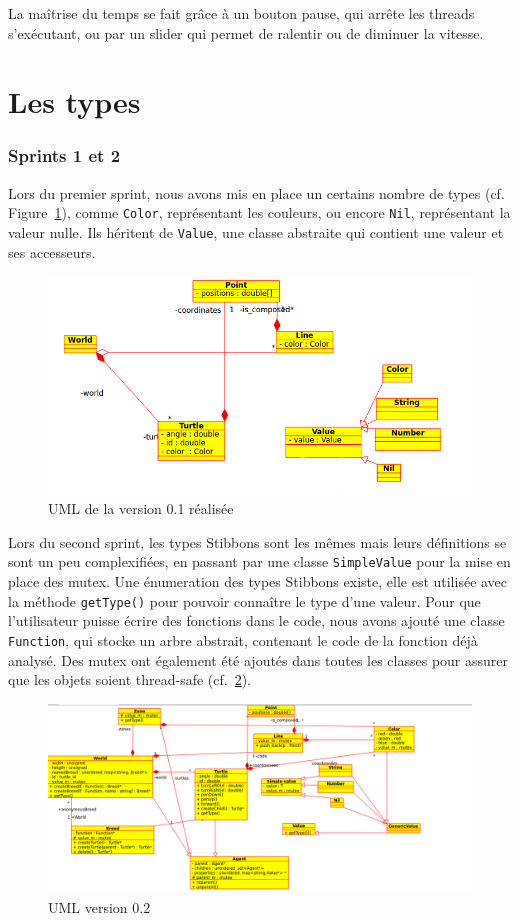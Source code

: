 La maîtrise du temps se fait grâce à un bouton pause, qui arrête les threads s'exécutant, ou par un slider qui permet de ralentir ou de diminuer la vitesse.

\section{Les types}
\subsubsection{Sprints 1 et 2}
Lors du premier sprint, nous avons mis en place un certains nombre de types (cf. Figure~\ref{v0.1R}), comme \verb|Color|, représentant les couleurs, ou encore \verb|Nil|, représentant la valeur nulle. Ils héritent de \verb|Value|, une classe abstraite qui contient une valeur et ses accesseurs.

\begin{figure}[h]
\includegraphics[scale=0.5]{doc/report/uml/v01reel.png}
\caption{\label{v0.1R} UML de la version 0.1 réalisée}
\end{figure}

Lors du second sprint, les types Stibbons sont les mêmes mais leurs définitions se sont un peu complexifiées, en passant par une classe \verb|SimpleValue| pour la mise en place des mutex. Une énumeration des types Stibbons existe, elle est utilisée avec la méthode \verb|getType()| pour pouvoir connaître le type d'une valeur.
Pour que l'utilisateur puisse écrire des fonctions dans le code, nous avons ajouté une classe \verb|Function|, qui stocke un arbre abstrait, contenant le code de la fonction déjà analysé.
Des mutex ont également été ajoutés dans toutes les classes pour assurer que les objets soient thread-safe (cf.~\ref{v0.2}).

\begin{figure}[h]
\includegraphics[scale=0.45]{doc/report/uml/v02.png}
\caption{\label{v0.2} UML version 0.2}
\end{figure}

